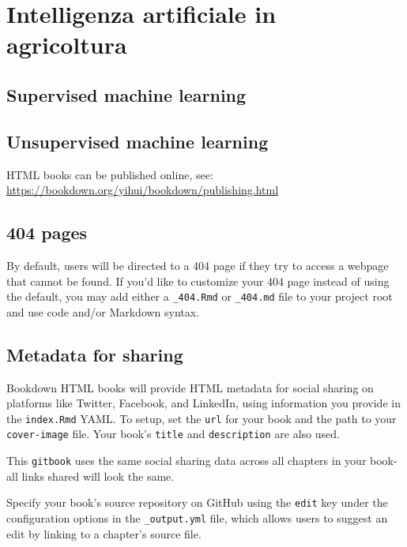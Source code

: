 \documentclass[
]{book}
\theoremstyle{definition}
\theoremstyle{definition}
\theoremstyle{definition}
\theoremstyle{definition}
\theoremstyle{remark}
\begin{document}
\hypertarget{intelligenza-artificiale-in-agricoltura}{%
\chapter{Intelligenza artificiale in agricoltura}\label{intelligenza-artificiale-in-agricoltura}}

\hypertarget{supervised-machine-learning}{%
\section{Supervised machine learning}\label{supervised-machine-learning}}

\hypertarget{unsupervised-machine-learning}{%
\section{Unsupervised machine learning}\label{unsupervised-machine-learning}}

HTML books can be published online, see: \url{https://bookdown.org/yihui/bookdown/publishing.html}

\hypertarget{pages-1}{%
\section{404 pages}\label{pages-1}}

By default, users will be directed to a 404 page if they try to access a webpage that cannot be found. If you'd like to customize your 404 page instead of using the default, you may add either a \texttt{\_404.Rmd} or \texttt{\_404.md} file to your project root and use code and/or Markdown syntax.

\hypertarget{metadata-for-sharing-1}{%
\section{Metadata for sharing}\label{metadata-for-sharing-1}}

Bookdown HTML books will provide HTML metadata for social sharing on platforms like Twitter, Facebook, and LinkedIn, using information you provide in the \texttt{index.Rmd} YAML. To setup, set the \texttt{url} for your book and the path to your \texttt{cover-image} file. Your book's \texttt{title} and \texttt{description} are also used.

This \texttt{gitbook} uses the same social sharing data across all chapters in your book- all links shared will look the same.

Specify your book's source repository on GitHub using the \texttt{edit} key under the configuration options in the \texttt{\_output.yml} file, which allows users to suggest an edit by linking to a chapter's source file.
\end{document}
